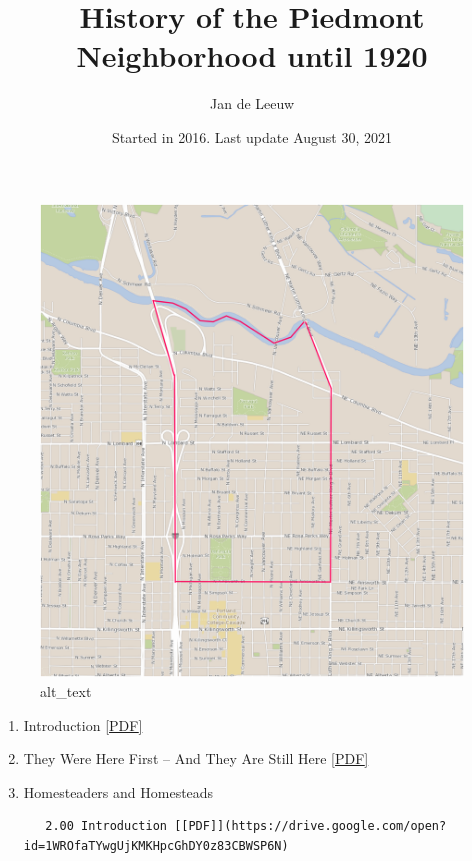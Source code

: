 \documentclass[
  12pt,
]{book}
\title{History of the Piedmont Neighborhood until 1920}
\author{Jan de Leeuw}
\date{Started in 2016. Last update August 30, 2021}
\begin{document}
\maketitle

{
\setcounter{tocdepth}{4}
\tableofcontents
}
\begin{figure}
\centering
\includegraphics{index/images/image1.png}
\caption{alt\_text}
\end{figure}

\begin{enumerate}
\def\labelenumi{\arabic{enumi}.}
\setcounter{enumi}{-1}
\item
  Introduction \href{https://drive.google.com/open?id=1QzHMQrMUnutETlBx5yGboK6RO50koiM_}{{[}PDF{]}}
\item
  They Were Here First -- And They Are Still Here \href{https://drive.google.com/open?id=1kWwwu8cXTcRqNVLZfDET9bZqTH_VN13UUYbacRjDL9M}{{[}PDF{]}}
\item
  Homesteaders and Homesteads

\begin{verbatim}
   2.00 Introduction [[PDF]](https://drive.google.com/open?id=1WROfaTYwgUjKMKHpcGhDY0z83CBWSP6N)
\end{verbatim}
\end{enumerate}
\end{document}
